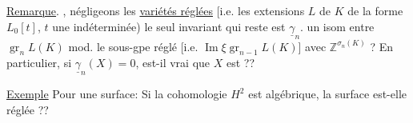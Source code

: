 \uline{Remarque}. , négligeons les
\uline{variétés réglées} 
[i.e. les extensions $L$ de $K$
de la forme $L_0[t]$, $t$ une indéterminée)
le seul invariant  qui reste est
$\underline{\gamma}_n$.
 un isom entre
$\operatorname{gr}_nL(K)$ mod. le sous-gpe réglé
[i.e. $\operatorname{Im}\xi\operatorname{gr}_{n-1}L(K)$] avec
$\mathbb{Z}^{\sigma_n(K)}$ ?
En particulier, si
$\underline{\gamma}_n(X)=0$, 
est-il vrai que $X$
est  ??

\uline{Exemple} Pour une surface: Si la cohomologie
$H^2$ est algébrique, la surface est-elle
réglée ??
